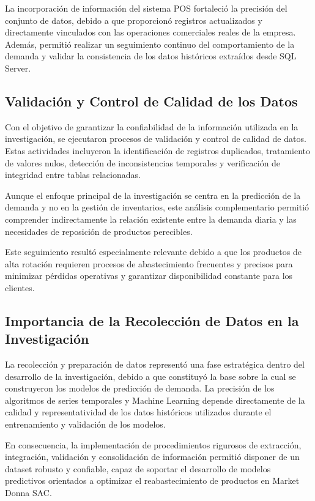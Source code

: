 			La incorporación de información del sistema POS fortaleció la precisión del conjunto de datos, debido a que proporcionó registros actualizados y directamente vinculados con las operaciones comerciales reales de la empresa. Además, permitió realizar un seguimiento continuo del comportamiento de la demanda y validar la consistencia de los datos históricos extraídos desde SQL Server.

			\subsection{Validación y Control de Calidad de los Datos}

			Con el objetivo de garantizar la confiabilidad de la información utilizada en la investigación, se ejecutaron procesos de validación y control de calidad de datos. Estas actividades incluyeron la identificación de registros duplicados, tratamiento de valores nulos, detección de inconsistencias temporales y verificación de integridad entre tablas relacionadas.

			Aunque el enfoque principal de la investigación se centra en la predicción de la demanda y no en la gestión de inventarios, este análisis complementario permitió comprender indirectamente la relación existente entre la demanda diaria y las necesidades de reposición de productos perecibles.

			Este seguimiento resultó especialmente relevante debido a que los productos de alta rotación requieren procesos de abastecimiento frecuentes y precisos para minimizar pérdidas operativas y garantizar disponibilidad constante para los clientes.

			\subsection{Importancia de la Recolección de Datos en la Investigación}

			La recolección y preparación de datos representó una fase estratégica dentro del desarrollo de la investigación, debido a que constituyó la base sobre la cual se construyeron los modelos de predicción de demanda. La precisión de los algoritmos de series temporales y Machine Learning depende directamente de la calidad y representatividad de los datos históricos utilizados durante el entrenamiento y validación de los modelos.

			En consecuencia, la implementación de procedimientos rigurosos de extracción, integración, validación y consolidación de información permitió disponer de un dataset robusto y confiable, capaz de soportar el desarrollo de modelos predictivos orientados a optimizar el reabastecimiento de productos en Market Donna SAC.


